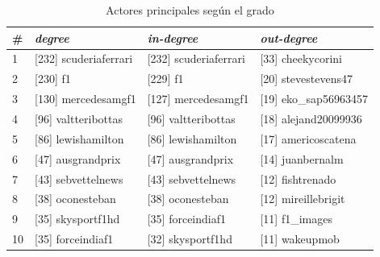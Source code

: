 \begin{table}[H]
	\centering
	\caption{Actores principales según el grado}
	\label{tab:actores-principales-grado}
	\begin{tabular}{| l | l l l |}
		\hline
		\# & \textit{degree}       & \textit{in-degree}     & \textit{out-degree}   \\
		\hline
		1  & [232] scuderiaferrari & [232] scuderiaferrari  & [33] cheekycorini     \\
		2  & [230] f1              & [229] f1               & [20] stevestevens47   \\
		3  & [130] mercedesamgf1   & [127] mercedesamgf1    & [19] eko\_sap56963457 \\
		4  & [96] valtteribottas   & [96] valtteribottas    & [18] alejand20099936  \\
		5  & [86] lewishamilton    & [86] lewishamilton     & [17] americoscatena   \\
		6  & [47] ausgrandprix     & [47] ausgrandprix      & [14] juanbernalm      \\
		7  & [43] sebvettelnews    & [43] sebvettelnews     & [12] fishtrenado      \\
		8  & [38] oconesteban      & [38] oconesteban       & [12] mireillebrigit   \\
		9  & [35] skysportf1hd     & [35] forceindiaf1      & [11] f1\_images       \\
		10 & [35] forceindiaf1     & [32] skysportf1hd      & [11] wakeupmob        \\
		\hline
	\end{tabular}
\end{table}

